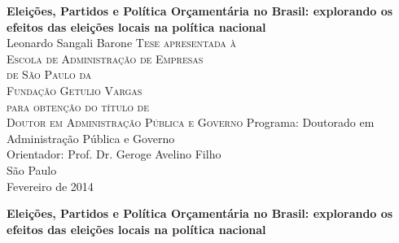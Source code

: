 \documentclass[12pt,twoside,a4paper]{book}
\begin{document}
\frontmatter 
\fancyhead[RO]{{\footnotesize\rightmark}\hspace{2em}\thepage}
\setcounter{tocdepth}{2}
\fancyhead[LE]{\thepage\hspace{2em}\footnotesize{\leftmark}}
\fancyhead[RE,LO]{}
\fancyhead[RO]{{\footnotesize\rightmark}\hspace{2em}\thepage}

\onehalfspacing  %

\thispagestyle{empty}
\begin{center}
    \vspace*{2.3cm}
    \textbf{\Large{Eleições, Partidos e Política Orçamentária no Brasil: explorando os efeitos das eleições locais na política nacional
}}\\
    \vspace*{1.8cm}
    \Large{Leonardo Sangali Barone}
    \vskip 2cm
    \textsc{
    Tese apresentada à\\[-0.25cm] 
    Escola de Administração de Empresas\\[-0.25cm]
    de São Paulo da\\[-0.25cm]
	Fundação Getulio Vargas\\[-0.25cm]
    para obtenção do título de\\[-0.25cm]
    Doutor em Administração Pública e Governo}
    \vskip 2cm
    Programa: Doutorado em Administração Pública e Governo\\
    Orientador: Prof. Dr. Geroge Avelino Filho\\
    \vskip 4cm
    \normalsize{São Paulo\\Fevereiro de 2014}
\end{center}

\newpage
\thispagestyle{empty}
    \begin{center}
        \vspace*{2.3 cm}
        \textbf{\Large{Eleições, Partidos e Política Orçamentária no Brasil: explorando os efeitos das eleições locais na política nacional}}\\
        \vspace*{2 cm}
    \end{center}

    \vskip 2cm
\end{document}
